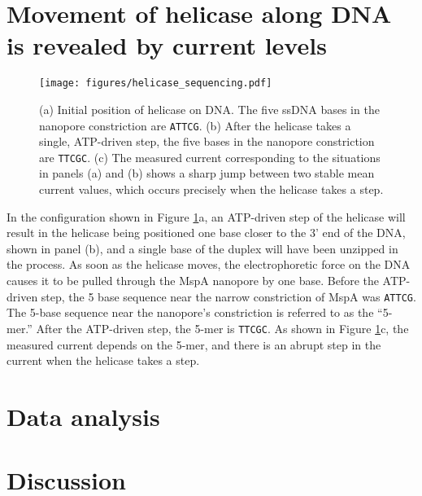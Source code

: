 \section{Movement of helicase along DNA is revealed by current levels}

\begin{figure}[h]
\begin{centering}
\texttt{[image: figures/helicase\_sequencing.pdf]}
\caption[Sequencing DNA with the help of a helicase]{(a) Initial position of helicase on DNA.  The five ssDNA bases in the nanopore constriction are \texttt{ATTCG}.  (b) After the helicase takes a single, ATP-driven step, the five bases in the nanopore constriction are \texttt{TTCGC}.  (c) The measured current corresponding to the situations in panels (a) and (b) shows a sharp jump between two stable mean current values, which occurs precisely when the helicase takes a step.}
\label{fig:helicase_sequencing}
\end{centering}
\end{figure}

In the configuration shown in Figure \ref{fig:helicase_sequencing}a, an ATP-driven step of the helicase will result in the helicase being positioned one base closer to the 3’ end of the DNA, shown in panel (b), and a single base of the duplex will have been unzipped in the process.  As soon as the helicase moves, the electrophoretic force on the DNA causes it to be pulled through the MspA nanopore by one base.  Before the ATP-driven step, the 5 base sequence near the narrow constriction of MspA was \texttt{ATTCG}.  The 5-base sequence near the nanopore’s constriction is referred to as the “5-mer.”  After the ATP-driven step, the 5-mer is \texttt{TTCGC}.  As shown in Figure \ref{fig:helicase_sequencing}c, the measured current depends on the 5-mer, and there is an abrupt step in the current when the helicase takes a step.

\section{Data analysis}

\section{Discussion}